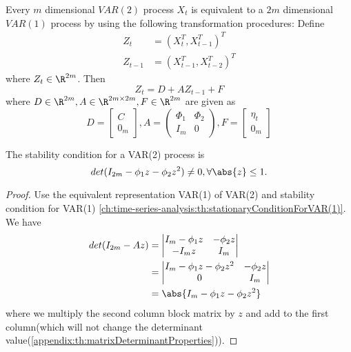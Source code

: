 \begin{lemma}
	Every $m$ dimensional $VAR(2)$ process $X_t$ is equivalent to a $2m$ dimensional $VAR(1)$ process by using the following transformation procedures:
	Define
	\begin{align*}
	Z_t &= (X_t^T,X_{t-1}^T)^T\\
	Z_{t-1} &= (X_{t-1}^T,X_{t-2}^T)^T
	\end{align*}
	where $Z_t \in \R^{2m}$. Then
	$$Z_t = D + AZ_{t-1} + F$$
	where $D\in \R^{2m},A\in \R^{2m\times 2m},F\in \R^{2m}$ are given as
	$$
	D = \begin{bmatrix}
	C\\ 0_m 
	\end{bmatrix}
	,
	A = \begin{pmatrix}
	\Phi_1 & \Phi_2 \\ 
	I_m & 0 
	\end{pmatrix}
	,
	F = \begin{bmatrix}
	\eta_t\\ 0_m 
	\end{bmatrix}
	$$ 
\end{lemma}


\begin{lemma}\cite[38]{tsay2013multivariate}
	The stability condition for a VAR(2) process is
	$$det(I_{2m} - \phi_1z - \phi_2 z^2) \neq 0, \forall \abs{z} \leq 1.$$
\end{lemma}
\begin{proof}
Use the equivalent representation VAR(1) of VAR(2) and stability condition for VAR(1) \autoref{ch:time-series-analysis:th:stationaryConditionForVAR(1)}.
We have
\begin{align*}
det(I_{2m} - Az) &= \begin{vmatrix}
I_m - \phi_1 z & -\phi_2 z\\
-I_m z  & I_m
\end{vmatrix} \\
& =  \begin{vmatrix}
I_m - \phi_1 z - \phi_2 z^2 & -\phi_2 z\\
0  & I_m
\end{vmatrix} \\
& = \abs{I_m - \phi_1 z - \phi_2 z^2}
\end{align*}
where we multiply the second column block matrix by $z$ and add to the first column(which will not change the determinant value(\autoref{appendix:th:matrixDeterminantProperties})).
\end{proof}




